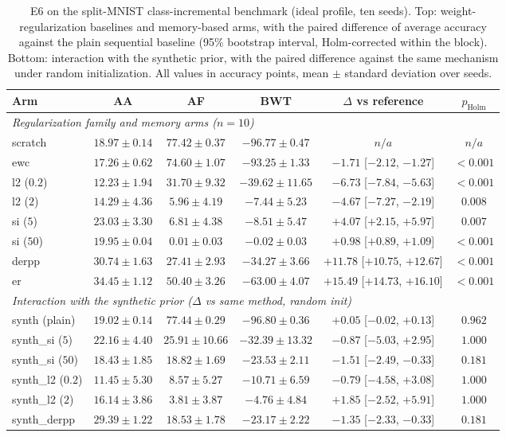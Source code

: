 \begin{table}[ht]
\centering
\small
\setlength{\tabcolsep}{4pt}
\caption{E6 on the split-MNIST class-incremental benchmark (ideal profile, ten seeds). Top: weight-regularization baselines and memory-based arms, with the paired difference of average accuracy against the plain sequential baseline (95\% bootstrap interval, Holm-corrected within the block). Bottom: interaction with the synthetic prior, with the paired difference against the same mechanism under random initialization. All values in accuracy points, mean $\pm$ standard deviation over seeds.}
\label{tab:e6_family}
\begin{tabular}{lccccc}
\toprule
Arm & AA & AF & BWT & $\Delta$ vs reference & $p_{\text{Holm}}$ \\
\midrule
\multicolumn{6}{l}{\textit{Regularization family and memory arms ($n=10$)}} \\
scratch & $18.97 \pm 0.14$ & $77.42 \pm 0.37$ & $-96.77 \pm 0.47$ & $n/a$ & $n/a$ \\
ewc & $17.26 \pm 0.62$ & $74.60 \pm 1.07$ & $-93.25 \pm 1.33$ & $-1.71$ [$-2.12$, $-1.27$] & $<0.001$ \\
l2 ($0.2$) & $12.23 \pm 1.94$ & $31.70 \pm 9.32$ & $-39.62 \pm 11.65$ & $-6.73$ [$-7.84$, $-5.63$] & $<0.001$ \\
l2 ($2$) & $14.29 \pm 4.36$ & $5.96 \pm 4.19$ & $-7.44 \pm 5.23$ & $-4.67$ [$-7.27$, $-2.19$] & $0.008$ \\
si ($5$) & $23.03 \pm 3.30$ & $6.81 \pm 4.38$ & $-8.51 \pm 5.47$ & $+4.07$ [$+2.15$, $+5.97$] & $0.007$ \\
si ($50$) & $19.95 \pm 0.04$ & $0.01 \pm 0.03$ & $-0.02 \pm 0.03$ & $+0.98$ [$+0.89$, $+1.09$] & $<0.001$ \\
derpp & $30.74 \pm 1.63$ & $27.41 \pm 2.93$ & $-34.27 \pm 3.66$ & $+11.78$ [$+10.75$, $+12.67$] & $<0.001$ \\
er & $34.45 \pm 1.12$ & $50.40 \pm 3.26$ & $-63.00 \pm 4.07$ & $+15.49$ [$+14.73$, $+16.10$] & $<0.001$ \\
\midrule
\multicolumn{6}{l}{\textit{Interaction with the synthetic prior ($\Delta$ vs same method, random init)}} \\
synth (plain) & $19.02 \pm 0.14$ & $77.44 \pm 0.29$ & $-96.80 \pm 0.36$ & $+0.05$ [$-0.02$, $+0.13$] & $0.962$ \\
synth\_si ($5$) & $22.16 \pm 4.40$ & $25.91 \pm 10.66$ & $-32.39 \pm 13.32$ & $-0.87$ [$-5.03$, $+2.95$] & $1.000$ \\
synth\_si ($50$) & $18.43 \pm 1.85$ & $18.82 \pm 1.69$ & $-23.53 \pm 2.11$ & $-1.51$ [$-2.49$, $-0.33$] & $0.181$ \\
synth\_l2 ($0.2$) & $11.45 \pm 5.30$ & $8.57 \pm 5.27$ & $-10.71 \pm 6.59$ & $-0.79$ [$-4.58$, $+3.08$] & $1.000$ \\
synth\_l2 ($2$) & $16.14 \pm 3.86$ & $3.81 \pm 3.87$ & $-4.76 \pm 4.84$ & $+1.85$ [$-2.52$, $+5.91$] & $1.000$ \\
synth\_derpp & $29.39 \pm 1.22$ & $18.53 \pm 1.78$ & $-23.17 \pm 2.22$ & $-1.35$ [$-2.33$, $-0.33$] & $0.181$ \\
\bottomrule
\end{tabular}
\end{table}
